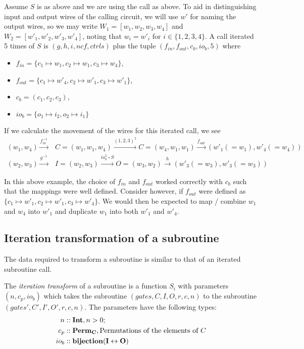 \begin{example}
\end{example}
Assume $S$ is as above and we are using the call as above.
To aid in distinguishing input and output wires of the calling circuit,
we will use $w'$ for naming the output wires, so we may write
$W_1 = [w_1,w_2,w_3,w_4]$ and $W_2=[w'_1,w'_2,w'_3,w'_4]$, noting that
$w_i = w'_i$ for $i\in\{1,2,3,4\}$. A call iterated 5 times of
$S$ is $(g,h,i,ncf,ctrls)$ plus
the tuple $(f_{in},f_{out},c_b,io_b,5)$ where
\begin{itemize}
  \item $f_{in} = \{c_1\mapsto w_1, c_2 \mapsto w_1, c_3 \mapsto w_4\}$,
  \item $f_{out} = \{c_1\mapsto w'_4, c_2 \mapsto w'_1, c_3 \mapsto w'_1\}$,
  \item $c_b = (c_1,c_2,c_3)$,
  \item $io_b = \{o_1\mapsto i_2, o_2\mapsto i_1\}$
\end{itemize}
If we calculate the movement of the wires for this iterated call, we see
\begin{align}
  (w_1,w_4)\xrightarrow{f_{in}^{-1}} &C=(w_1,w_1,w_4) \xrightarrow{(1,2,3)^5}
    C=(w_4,w_1,w_1) \xrightarrow{f_{out}} (w'_1(=w_1),w'_4(=w_4))\\
  (w_2,w_3)\xrightarrow{g^{-1}} &I=(w_2,w_3) \xrightarrow{io_b^5\circ S}
    O=(w_3,w_2) \xrightarrow{h} (w'_3(=w_3),w'_3(=w_3))
\end{align}


In this above example, the choice of $f_{in}$ and $f_{out}$
worked correctly with $c_b$ such that the mappings were
well defined. Consider however, if $f_{out}$ were defined
as $\{c_1\mapsto w'_1, c_2 \mapsto w'_1, c_3 \mapsto w'_4\}$.
We would then be expected to map / combine $w_1$ and $w_4$
into $w'_1$ and duplicate $w_1$ into both $w'_1$ and $w'_4$.



\subsection{Iteration transformation of a subroutine} %
\label{sub:iteration_transformation_of_a_subroutine}

The data required to transform a subroutine is similar to that of an iterated
subroutine call.

\begin{definition}\label{def:iteration_transform}
  The \emph{iteration transform} of a subroutine is a function $S_i$ with
  parameters $(n,c_p,io_b)$ which takes the subroutine $(gates,C,I,O,r,c,n)$
  to the subroutine $(gates',C',I',O',r,c,n)$.
  The parameters have the following types:
  \begin{align*}
    n&::\mathbf{{Int}}, n>0;\\
    c_p&::\mathbf{{Perm_C}}, \text{Permutations of the elements of }C\\
    io_b&::\mathbf{{bijection(I\leftrightarrow O)}}
  \end{align*}
\end{definition}

